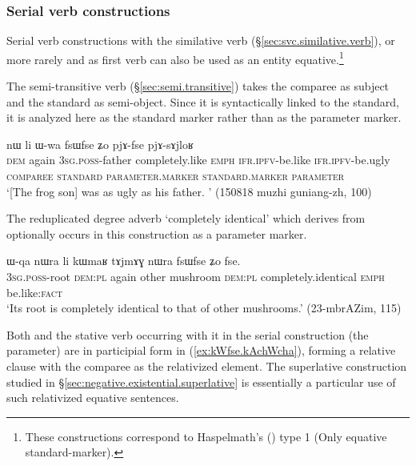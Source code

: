 \subsubsection{Serial verb constructions} \label{sec:svc.equative}
Serial verb constructions with the similative verb  (§\ref{sec:svc.similative.verb}), or more rarely   and  as first verb can also be used as an entity equative.\footnote{These constructions correspond to  Haspelmath's (\citeyear{haspelmath17equative}) type 1 (Only equative standard-marker). }


The semi-transitive verb  (§\ref{sec:semi.transitive})  takes the comparee as subject and the standard as semi-object. Since it is syntactically linked to the standard, it is analyzed here as the standard marker rather than as the parameter marker. 
  
\begin{exe}
\ex \label{ex:pjAfse.pjAsAjloR}
\glll nɯ li ɯ-wa fsɯfse ʑo pjɤ-fse pjɤ-sɤjloʁ \\
\textsc{dem} again \textsc{3sg}.\textsc{poss}-father completely.like \textsc{emph} \textsc{ifr}.\textsc{ipfv}-be.like \textsc{ifr}.\textsc{ipfv}-be.ugly \\
\textsc{comparee} { } \textsc{standard} \textsc{parameter}.\textsc{marker} { } \textsc{standard}.\textsc{marker} \textsc{parameter} \\
\glt `[The frog son] was as ugly as his father. ' (150818 muzhi guniang-zh, 100)
\end{exe}

The reduplicated degree adverb  `completely identical' which derives from  optionally occurs in this construction as a parameter marker.

\begin{exe} 
	\ex \label{ex:fsWfse.Zo.fse}
	\gll ɯ-qa nɯra li kɯmaʁ tɤjmɤɣ nɯra fsɯfse ʑo fse. \\
	\textsc{3sg}.\textsc{poss}-root \textsc{dem}:\textsc{pl} again other mushroom \textsc{dem}:\textsc{pl} completely.identical \textsc{emph} be.like:\textsc{fact} \\
	\glt `Its root is completely identical to that of other mushrooms.' (23-mbrAZim, 115)
\end{exe}


Both  and the stative verb occurring with it in the serial construction (the parameter) are in participial form in (\ref{ex:kWfse.kAchWcha}), forming a relative clause with the comparee as the relativized element. The superlative construction studied in §\ref{sec:negative.existential.superlative} is essentially a particular use of such relativized equative sentences.

